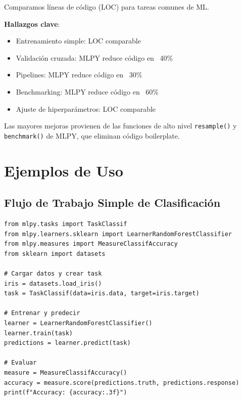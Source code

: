 \documentclass[twoside,11pt]{article}
\begin{document}
Comparamos líneas de código (LOC) para tareas comunes de ML.


\textbf{Hallazgos clave}:
\begin{itemize}
  \item Entrenamiento simple: LOC comparable
  \item Validación cruzada: MLPY reduce código en ~40\%
  \item Pipelines: MLPY reduce código en ~30\%
  \item Benchmarking: MLPY reduce código en ~60\%
  \item Ajuste de hiperparámetros: LOC comparable
\end{itemize}

Las mayores mejoras provienen de las funciones de alto nivel \texttt{resample()} y \texttt{benchmark()} de MLPY, que eliminan código boilerplate.





\section{Ejemplos de Uso}
\label{sec:examples}

\subsection{Flujo de Trabajo Simple de Clasificación}

\begin{lstlisting}
from mlpy.tasks import TaskClassif
from mlpy.learners.sklearn import LearnerRandomForestClassifier
from mlpy.measures import MeasureClassifAccuracy
from sklearn import datasets

# Cargar datos y crear task
iris = datasets.load_iris()
task = TaskClassif(data=iris.data, target=iris.target)

# Entrenar y predecir
learner = LearnerRandomForestClassifier()
learner.train(task)
predictions = learner.predict(task)

# Evaluar
measure = MeasureClassifAccuracy()
accuracy = measure.score(predictions.truth, predictions.response)
print(f"Accuracy: {accuracy:.3f}")
\end{lstlisting}
\end{document}

